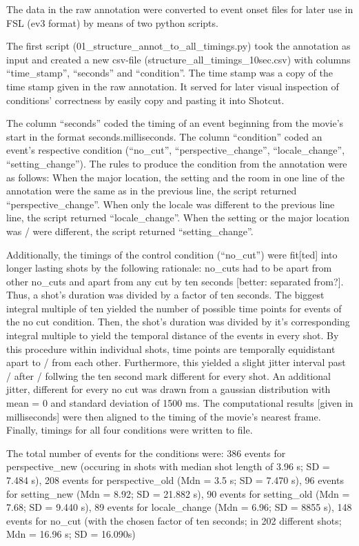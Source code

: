 \documentclass[10pt,a4paper,twocolumn]{article}
\begin{document}
The data in the raw annotation were converted to event onset files
for later use in FSL (ev3 format) by means of two python scripts. 

The first script (01\_structure\_annot\_to\_all\_timings.py) took
the annotation as input and created a new csv-file (structure\_all\_timings\_10sec.csv)
with columns ``time\_stamp'', ``seconds'' and ``condition''.
The time stamp was a copy of the time stamp given in the raw annotation.
It served for later visual inspection of conditions' correctness by
easily copy and pasting it into Shotcut. 

The column ``seconds'' coded the timing of an event beginning from
the movie's start in the format seconds.milliseconds. The column ``condition''
coded an event's respective condition (``no\_cut'', ``perspective\_change'',
``locale\_change'', ``setting\_change''). The rules to produce
the condition from the annotation were as follows: When the major
location, the setting and the room in one line of the annotation were
the same as in the previous line, the script returned ``perspective\_change''.
When only the locale was different to the previous line line, the
script returned ``locale\_change''. When the setting or the major
location was / were different, the script returned ``setting\_change''. 

Additionally, the timings of the control condition (``no\_cut'')
were fit{[}ted{]} into longer lasting shots by the following rationale:
no\_cuts had to be apart from other no\_cuts and apart from any cut
by ten seconds {[}better: separated from?{]}. Thus, a shot's duration
was divided by a factor of ten seconds. The biggest integral multiple
of ten yielded the number of possible time points for events of the
no cut condition. Then, the shot's duration was divided by it's corresponding
integral multiple to yield the temporal distance of the events in
every shot. By this procedure within individual shots, time points
are temporally equidistant apart to / from each other. Furthermore,
this yielded a slight jitter interval past / after / follwing the
ten second mark different for every shot. An additional jitter, different
for every no cut was drawn from a gaussian distribution with mean
= 0 and standard deviation of 1500 ms. The computational results {[}given
in milliseconds{]} were then aligned to the timing of the movie's
nearest frame. Finally, timings for all four conditions were written
to file. 

The total number of events for the conditions were: 386 events for
perspective\_new (occuring in shots with median shot length of 3.96
s; SD = 7.484 s), 208 events for perspective\_old (Mdn = 3.5 s; SD
= 7.470 s), 96 events for setting\_new (Mdn = 8.92; SD = 21.882 s),
90 events for setting\_old (Mdn = 7.68; SD = 9.440 s), 89 events for
locale\_change (Mdn = 6.96; SD = 8855 s), 148 events for no\_cut (with
the chosen factor of ten seconds; in 202 different shots; Mdn = 16.96
s; SD = 16.090s)
\end{document}
